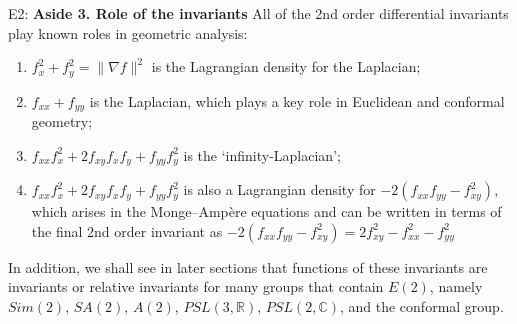 \documentclass[review,onefignum,onetabnum]{siamonline190516}
\begin{document}
E2:
{\bf Aside 3. Role of the invariants} 
All of the 2nd order differential invariants play known roles in geometric analysis:
\begin{enumerate}
\item $f_x^2 + f_y^2=\|\nabla f\|^2$ is the Lagrangian density for the Laplacian;
\item $f_{xx} + f_{yy}$ is the Laplacian, which plays a key role in Euclidean and conformal geometry;
\item $f_{xx}f_x^2 + 2 f_{xy} f_x f_y + f_{yy} f_y^2 $ is the `infinity-Laplacian'; 
\item $f_{xx}f_x^2 + 2 f_{xy} f_x f_y + f_{yy} f_y^2 $ is also a Lagrangian density for $-2(f_{xx} f_{yy} - f_{xy}^2)$, which arises in the Monge--Amp\`ere equations and
can be written in terms of the final 2nd order invariant as $-2 (f_{xx} f_{yy} - f_{xy}^2) = 2 f_{xy}^2 - f_{xx}^2 - f_{yy}^2$
\end{enumerate}
In addition, we shall see in later sections that functions of these invariants are invariants or
relative invariants for many groups that contain $E(2)$, namely $Sim(2)$, $SA(2)$, $A(2)$, $PSL(3,\mathbb{R})$, $PSL(2,\mathbb{C})$, and the conformal group.
\end{document}

